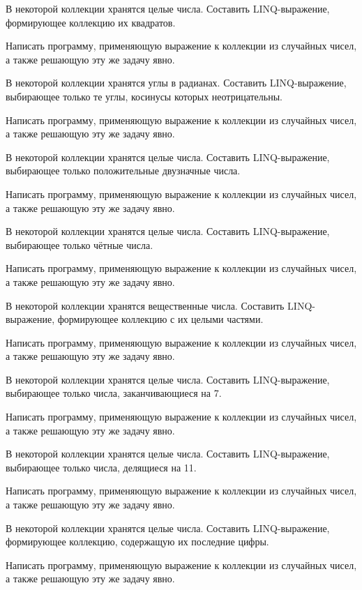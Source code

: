 \task В некоторой коллекции хранятся целые числа. Составить
LINQ-выражение, формирующее коллекцию их квадратов.

Написать программу, применяющую выражение к коллекции из случайных
чисел, а также решающую эту же задачу явно.

\task В некоторой коллекции хранятся углы в радианах. Составить
LINQ-выражение, выбирающее только те углы, косинусы которых
неотрицательны.

Написать программу, применяющую выражение к коллекции из случайных
чисел, а также решающую эту же задачу явно.

\task В некоторой коллекции хранятся целые числа. Составить
LINQ-выражение, выбирающее только положительные двузначные числа.

Написать программу, применяющую выражение к коллекции из случайных
чисел, а также решающую эту же задачу явно.

\task В некоторой коллекции хранятся целые числа. Составить
LINQ-выражение, выбирающее только чётные числа.

Написать программу, применяющую выражение к коллекции из случайных
чисел, а также решающую эту же задачу явно.

\task В некоторой коллекции хранятся вещественные числа. Составить
LINQ-выражение, формирующее коллекцию с их целыми частями.

Написать программу, применяющую выражение к коллекции из случайных
чисел, а также решающую эту же задачу явно.

\task В некоторой коллекции хранятся целые числа. Составить
LINQ-выражение, выбирающее только числа, заканчивающиеся на 7.

Написать программу, применяющую выражение к коллекции из случайных
чисел, а также решающую эту же задачу явно.

\task В некоторой коллекции хранятся целые числа. Составить
LINQ-выражение, выбирающее только числа, делящиеся на 11.

Написать программу, применяющую выражение к коллекции из случайных
чисел, а также решающую эту же задачу явно.

\task В некоторой коллекции хранятся целые числа. Составить
LINQ-выражение, формирующее коллекцию, содержащую их последние цифры.

Написать программу, применяющую выражение к коллекции из случайных
чисел, а также решающую эту же задачу явно.
